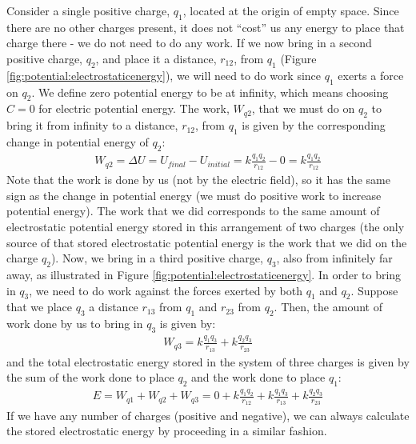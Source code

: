 Consider a single positive charge, $q_1$, located at the origin of empty space. Since there are no other charges present, it does not ``cost'' us any energy to place that charge there - we do not need to do any work. If we now bring in a second positive charge, $q_2$, and place it a distance, $r_{12}$, from $q_1$ (Figure \ref{fig:potential:electrostaticenergy}), we will need to do work since $q_1$ exerts a force on $q_2$. We define zero potential energy to be at infinity, which means choosing $C=0$ for electric potential energy. The work, $W_{q2}$, that we must do on $q_2$ to bring it from infinity to a distance, $r_{12}$, from $q_1$ is given by the corresponding change in potential energy of $q_2$:
\begin{align*}
W_{q2}=\Delta U=U_{final}-U_{initial}=k\frac{q_1q_2}{r_{12}}-0=k\frac{q_1q_2}{r_{12}}
\end{align*}
Note that the work is done by us (not by the electric field), so it has the same sign as the change in potential energy (we must do positive work to increase potential energy). The work that we did corresponds to the same amount of electrostatic potential energy stored in this arrangement of two charges (the only source of that stored electrostatic potential energy is the work that we did on the charge $q_2$). 
Now, we bring in a third positive charge, $q_3$, also from infinitely far away, as illustrated in Figure \ref{fig:potential:electrostaticenergy}. In order to bring in $q_3$, we need to do work against the forces exerted by both $q_1$ and $q_2$. Suppose that we place $q_3$ a distance $r_{13}$ from $q_1$ and $r_{23}$ from $q_2$. Then, the amount of work done by us to bring in $q_3$ is given by:
\begin{align*}
W_{q3}=k\frac{q_1q_3}{r_{13}}+k\frac{q_2q_3}{r_{23}}
\end{align*}
and the total electrostatic energy stored in the system of three charges is given by the sum of the work done to place $q_2$ and the work done to place $q_1$:
\begin{align*}
E = W_{q1}+W_{q2}+W_{q3}=0+k\frac{q_1q_2}{r_{12}}+k\frac{q_1q_3}{r_{13}}+k\frac{q_2q_3}{r_{23}}
\end{align*}
If we have any number of charges (positive and negative), we can always calculate the stored electrostatic energy by proceeding in a similar fashion. 

